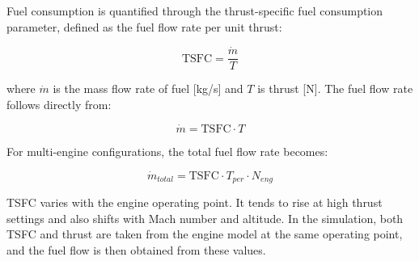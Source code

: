 
Fuel consumption is quantified through the thrust-specific fuel consumption parameter, defined as the fuel flow rate per unit thrust:

\begin{equation}
\text{TSFC} = \frac{\dot{m}}{T}
\end{equation}

where $\dot{m}$ is the mass flow rate of fuel [kg/s] and $T$ is thrust [N]. The fuel flow rate follows directly from:

\begin{equation}
\dot{m} = \text{TSFC} \cdot T
\end{equation}

For multi-engine configurations, the total fuel flow rate becomes:

\begin{equation}
\dot{m}_{total} = \text{TSFC} \cdot T_{per} \cdot N_{eng}
\end{equation}

TSFC varies with the engine operating point. It tends to rise at high thrust settings and also shifts with Mach number and altitude. In the simulation, both TSFC and thrust are taken from the engine model at the same operating point, and the fuel flow is then obtained from these values.

